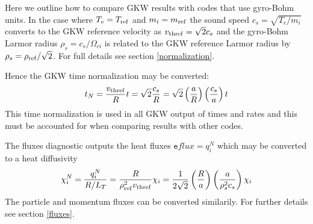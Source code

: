 \documentclass{report}
\begin{document}
Here we outline how to compare GKW results with codes that use gyro-Bohm units.
In the case where $T_e=T_{\rm ref}$ and $m_i=m_{\rm ref}$ the sound speed $c_s=\sqrt{T_e / m_i}$
converts to the GKW reference velocity as $v_{\rm thref}=\sqrt{2} c_s$ and the gyro-Bohm Larmor
radius $\rho_s=c_s/\Omega_{ci}$ is related to the GKW reference Larmor radius by $\rho_s=\rho_{\rm
ref}/\sqrt{2}$. For full details see section \ref{normalization}.

Hence the GKW time normalization may be converted:
\begin{equation}
t_N = {v_{\rm thref} \over R} t = \sqrt{2}{c_s \over R} = \sqrt{2} \left({a \over R}\right) \left({c_s \over a}\right) t
\end{equation}
This time normalization is used in all GKW output of times and rates and this must be accounted for when comparing results with other codes.  %

The fluxes diagnostic outputs the heat fluxes ${\texttt eflux} = q_i^N$ which may be converted to a heat diffusivity
\begin{equation}
\chi_i^N={q_i^N \over R/L_T}={R \over \rho_{\rm ref}^2 v_{\rm thref}} \chi_i = {1 \over 2\sqrt{2}}\left({R \over a}\right)\left({a \over \rho_s^2 c_s}\right) \chi_i 
\end{equation}
The particle and momentum fluxes can be converted similarily.  For further details see section \ref{fluxes}.

%



\end{document}

